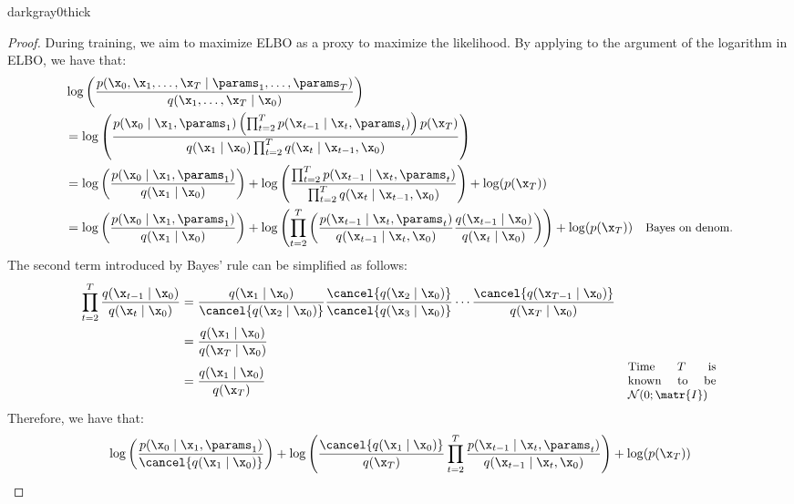 \begin{description}
\begin{description}
\begin{marginbar}{darkgray}{0}{thick}
\begin{proof}
                    During training, we aim to maximize ELBO as a proxy to maximize the likelihood. By applying  to the argument of the logarithm in ELBO, we have that:
                    \[
                        \begin{aligned}
                            &\log\left( \frac{p(\x_0, \x_1, \dots, \x_T \mid \params_1, \dots, \params_T)}{q(\x_1, \dots, \x_T \mid \x_0)} \right) \\
                            &= \log\left( \frac{p(\x_0 \mid \x_1, \params_1) \left( \prod_{t=2}^{T} p(\x_{t-1} \mid \x_t, \params_t) \right) p(\x_T)}{q(\x_1 \mid \x_0) \prod_{t=2}^T q(\x_t \mid \x_{t-1}, \x_0)} \right) \\
                            &= \log\left( \frac{p(\x_0 \mid \x_1, \params_1)}{q(\x_1 \mid \x_0)} \right) + \log\left( \frac{\prod_{t=2}^{T} p(\x_{t-1} \mid \x_t, \params_t)}{\prod_{t=2}^T q(\x_t \mid \x_{t-1}, \x_0)} \right) + \log(p(\x_T)) \\
                            &= \log\left( \frac{p(\x_0 \mid \x_1, \params_1)}{q(\x_1 \mid \x_0)} \right) + \log\left( \prod_{t=2}^{T} \left( \frac{p(\x_{t-1} \mid \x_t, \params_t)}{q(\x_{t-1} \mid \x_{t}, \x_0)} \frac{q(\x_{t-1} \mid \x_0)}{q(\x_t \mid \x_0)} \right) \right) + \log(p(\x_T)) 
                                & \text{\small Bayes on denom.} \\
                        \end{aligned}
                    \]
                    The second term introduced by Bayes' rule can be simplified as follows:
                    \[
                        \begin{aligned}
                            \prod_{t=2}^T \frac{q(\x_{t-1} \mid \x_0)}{q(\x_t \mid \x_0)} &= \frac{q(\x_1 \mid \x_0)}{\cancel{q(\x_2 \mid \x_0)}} \frac{\cancel{q(\x_2 \mid \x_0)}}{\cancel{q(\x_3 \mid \x_0)}} \cdots \frac{\cancel{q(\x_{T-1} \mid \x_0)}}{q(\x_T \mid \x_0)} \\
                            &= \frac{q(\x_1 \mid \x_0)}{q(\x_T \mid \x_0)} \\
                            &= \frac{q(\x_1 \mid \x_0)}{q(\x_T)} & \text{\parbox{0.2\linewidth}{\small Time $T$ is known to be $\mathcal{N}(0; \matr{I})$}}
                        \end{aligned}
                    \]
                    Therefore, we have that:
                    \[
                        \begin{aligned}
                            &\log\left( \frac{p(\x_0 \mid \x_1, \params_1)}{\cancel{q(\x_1 \mid \x_0)}} \right) + \log\left( \frac{\cancel{q(\x_1 \mid \x_0)}}{q(\x_T)} \prod_{t=2}^{T} \frac{p(\x_{t-1} \mid \x_t, \params_t)}{q(\x_{t-1} \mid \x_{t}, \x_0)} \right) + \log(p(\x_T)) \\

\end{aligned}\]
\end{proof}
\end{marginbar}
\end{description}
\end{description}
